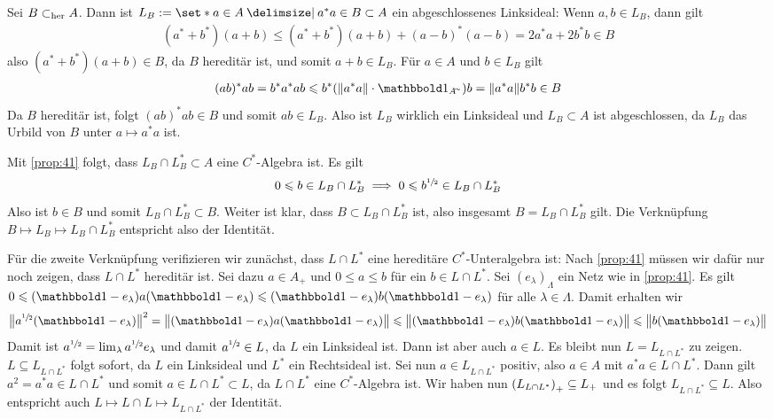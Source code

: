 \begin{beweis}
	Sei $B \subher A$. Dann ist $L_B := \set*{a \in A \given a^*a \in B} \subset A$ ein abgeschlossenes Linksideal: Wenn $a,b \in L_B$, dann gilt
	\begin{align}
		(a^*+b^*)(a+b) \le (a^*+b^*)(a+b)+ (a-b)^*(a-b) = 2a^*a + 2b^*b \in B
	\end{align}
	also $(a^*+b^*)(a+b) \in B$, da $B$ hereditär ist, und somit $a+b \in L_B$. 
	Für $a \in A$ und $b \in L_B$ gilt
	\begin{align}
		(ab)^* ab = b^*a^* ab \le b^* \enbrace*{\norm*{a^*a}\cdot \ind_{A^\simm}} b = \norm*{a^*a} b^*b \in B
	\end{align}
	Da $B$ hereditär ist, folgt $(ab)^*ab \in B$ und somit $ab \in L_B$. 
	Also ist $L_B$ wirklich ein Linksideal und $L_B \subset A$ ist abgeschlossen, da $L_B$ das Urbild von $B$ unter $a \mapsto a^*a$ ist.
	
	Mit \autoref{prop:41} folgt, dass $L_B \cap L_B^* \subset A$ eine $C^*$-Algebra ist. Es gilt
	\[
		0 \le b \in L_B \cap L_B^* \implies 0 \le b^{\sfrac{1}{2}} \in L_B \cap L_B^*
	\]  
	Also ist $b \in B$ und somit $L_B \cap L_B^* \subset B$. 
	Weiter ist klar, dass $B \subset L_B \cap L_B^*$ ist, also insgesamt $B=L_B \cap L_B^*$ gilt. 
	Die Verknüpfung $B \mapsto L_B \mapsto L_B \cap L_B^* $ entspricht also der Identität.
	
	Für die zweite Verknüpfung verifizieren wir zunächst, dass $L \cap L^*$ eine hereditäre $C^*$-Unteralgebra ist: 
	Nach \autoref{prop:41} müssen wir dafür nur noch zeigen, dass $L \cap L^*$ hereditär ist.
	Sei dazu $a \in A_+$ und $0 \le a \le b$ für ein $b \in L \cap L^*$. 
	Sei $(e_\lambda)_\Lambda$ ein Netz wie in \autoref{prop:41}. Es gilt
	\(
		0 \le (\ind-e_\lambda)a(\ind - e_\lambda) \le (\ind -e_\lambda) b (\ind -e_\lambda)
	\)
	für alle $\lambda \in \Lambda$. Damit erhalten wir
	\[
		\norm[\big]{a^{\sfrac{1}{2}}(\ind -e_\lambda)}^2= \norm[\big]{(\ind-e_\lambda)a(\ind -e_\lambda)} \le \norm[\big]{(\ind-e_\lambda)b(\ind -e_\lambda)} \le \norm[\big]{b(\ind -e_\lambda)}
	\]
	Damit ist $a^{\sfrac{1}{2}}=\lim_\lambda a^{\sfrac{1}{2}} e_\lambda$ und damit $a^{\sfrac{1}{2}} \in L$, da $L$ ein Linksideal ist. 
	Dann ist aber auch $a \in L$. Es bleibt nun $L= L_{L \cap L^*}$ zu zeigen.
	$L \subseteq L_{L \cap L^*}$ folgt sofort, da $L$ ein Linksideal und $L^*$ ein Rechtsideal ist.
	Sei nun $a \in L_{L \cap L^*}$ positiv, also $a \in A$ mit $a^*a \in L \cap L^*$.
	Dann gilt $a^2=a^*a \in L \cap L^*$ und somit $a \in L \cap L^* \subset L$, da $L \cap L^*$ eine $C^*$-Algebra ist.
	Wir haben nun $\enbrace*{L_{L \cap L^*}}_+ \subseteq L_+$ und es folgt $L_{L \cap L^*} \subseteq L$.
	Also entspricht auch $L \mapsto L \cap L \mapsto L_{L \cap L^*}$ der Identität.
\end{beweis}

